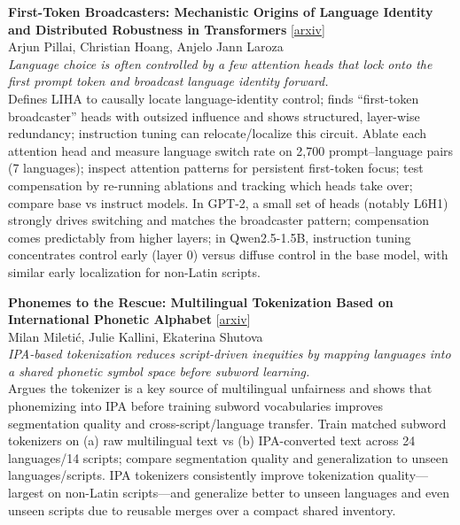 \documentclass[12pt,letterpaper]{article}
\begin{document}
\medskip

{\small\textbf{First-Token Broadcasters: Mechanistic Origins of Language Identity and Distributed Robustness in Transformers}} {\scriptsize[\href{https://arxiv.org/abs/2606.22361}{arxiv}]}\\
{\scriptsize Arjun Pillai, Christian Hoang, Anjelo Jann Laroza}\\

{\small\textit{Language choice is often controlled by a few attention heads that lock onto the first prompt token and broadcast language identity forward.}}\\[1pt]
{\footnotesize Defines LIHA to causally locate language-identity control; finds ``first-token broadcaster'' heads with outsized influence and shows structured, layer-wise redundancy; instruction tuning can relocate/localize this circuit. Ablate each attention head and measure language switch rate on 2,700 prompt--language pairs (7 languages); inspect attention patterns for persistent first-token focus; test compensation by re-running ablations and tracking which heads take over; compare base vs instruct models. In GPT-2, a small set of heads (notably L6H1) strongly drives switching and matches the broadcaster pattern; compensation comes predictably from higher layers; in Qwen2.5-1.5B, instruction tuning concentrates control early (layer 0) versus diffuse control in the base model, with similar early localization for non-Latin scripts.}

\medskip

{\small\textbf{Phonemes to the Rescue: Multilingual Tokenization Based on International Phonetic Alphabet}} {\scriptsize[\href{https://arxiv.org/abs/2606.20993}{arxiv}]}\\
{\scriptsize Milan Mileti\'c, Julie Kallini, Ekaterina Shutova}\\

{\small\textit{IPA-based tokenization reduces script-driven inequities by mapping languages into a shared phonetic symbol space before subword learning.}}\\[1pt]
{\footnotesize Argues the tokenizer is a key source of multilingual unfairness and shows that phonemizing into IPA before training subword vocabularies improves segmentation quality and cross-script/language transfer. Train matched subword tokenizers on (a) raw multilingual text vs (b) IPA-converted text across 24 languages/14 scripts; compare segmentation quality and generalization to unseen languages/scripts. IPA tokenizers consistently improve tokenization quality---largest on non-Latin scripts---and generalize better to unseen languages and even unseen scripts due to reusable merges over a compact shared inventory.}
\end{document}
